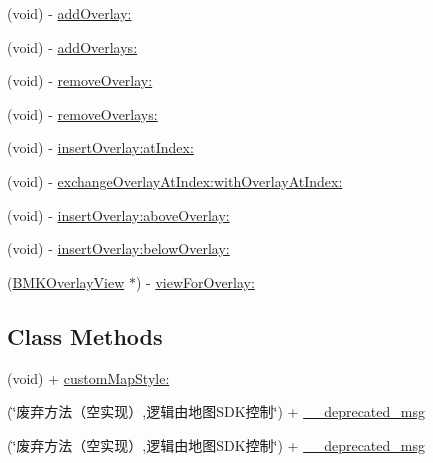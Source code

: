 \begin{DoxyCompactItemize}
(void) -\/ \hyperlink{interface_b_m_k_map_view_af85ad6091568df29d9e7c3dea82a1a2b}{add\+Overlay\+:}
\item 
(void) -\/ \hyperlink{interface_b_m_k_map_view_ab7d29d948515cc6d947d6aa63f904168}{add\+Overlays\+:}
\item 
(void) -\/ \hyperlink{interface_b_m_k_map_view_a3be1f2a019df3ff971f6a36f142e55be}{remove\+Overlay\+:}
\item 
(void) -\/ \hyperlink{interface_b_m_k_map_view_a3eb7909fb1adce117c1de432fd5d816a}{remove\+Overlays\+:}
\item 
(void) -\/ \hyperlink{interface_b_m_k_map_view_adc0775a2651c1e4099f93d9c1bbffe3d}{insert\+Overlay\+:at\+Index\+:}
\item 
(void) -\/ \hyperlink{interface_b_m_k_map_view_a62c1c29b8e5b408ba0c40411a3c1f50f}{exchange\+Overlay\+At\+Index\+:with\+Overlay\+At\+Index\+:}
\item 
(void) -\/ \hyperlink{interface_b_m_k_map_view_ad94b45c4df7978e3a6095918323496d3}{insert\+Overlay\+:above\+Overlay\+:}
\item 
(void) -\/ \hyperlink{interface_b_m_k_map_view_a73dfe9f74d722b7b1fc477e791f34653}{insert\+Overlay\+:below\+Overlay\+:}
\item 
(\hyperlink{interface_b_m_k_overlay_view}{B\+M\+K\+Overlay\+View} $\ast$) -\/ \hyperlink{interface_b_m_k_map_view_aa88093440ad22f7af9cf9a36051f662d}{view\+For\+Overlay\+:}
\end{DoxyCompactItemize}
\subsection*{Class Methods}
\begin{DoxyCompactItemize}
\item 
(void) + \hyperlink{interface_b_m_k_map_view_a9ee0304b50e3fc0792caf0889ac3df20}{custom\+Map\+Style\+:}
\item 
(\char`\"{}废弃方法（空实现）,逻辑由地图\+S\+D\+K控制\char`\"{}) + \hyperlink{interface_b_m_k_map_view_a518bfe7f1570aa1c15459d2fa06087f6}{\+\_\+\+\_\+deprecated\+\_\+msg}
\item 
(\char`\"{}废弃方法（空实现）,逻辑由地图\+S\+D\+K控制\char`\"{}) + \hyperlink{interface_b_m_k_map_view_a518bfe7f1570aa1c15459d2fa06087f6}{\+\_\+\+\_\+deprecated\+\_\+msg}
\end{DoxyCompactItemize}
